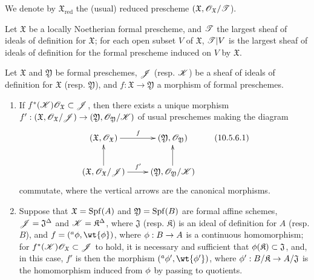 We denote by $\mathfrak{X}_\text{red}$ the (usual) reduced prescheme $(\mathfrak{X},\mathscr{O}_\mathfrak{X}/\mathscr{T}$).

\begin{corollary}[10.5.5]
\label{1.10.5.5}
Let $\mathfrak{X}$ be a locally Noetherian formal prescheme, and $\mathscr{T}$ the largest sheaf of ideals of definition for $\mathfrak{X}$; for each open subset $V$ of $\mathfrak{X}$, $\mathscr{T}|V$ is the largest sheaf of ideals of definition for the formal prescheme induced on $V$ by $\mathfrak{X}$.
\end{corollary}

\begin{proposition}[10.5.6]
\label{1.10.5.6}
Let $\mathfrak{X}$ and $\mathfrak{Y}$ be formal preschemes, $\mathscr{J}$ (resp. $\mathscr{K}$) be a sheaf of ideals of definition for $\mathfrak{X}$ (resp. $\mathfrak{Y}$), and $f:\mathfrak{X}\to\mathfrak{Y}$ a morphism of formal preschemes.
\begin{enumerate}[label=\emph{(\roman*)}]
  \item If $f^*(\mathscr{K})\mathscr{O}_\mathfrak{X}\subset\mathscr{J}$, then there exists a unique morphism $f':(\mathfrak{X},\sh{O}_\mathfrak{X}/\sh{J})\to(\mathfrak{Y},\sh{O}_\mathfrak{Y}/\sh{K})$ of usual preschemes making the diagram
    \begin{equation*}
    \label{1.10.5.6.1}
      \xymatrix{
        (\mathfrak{X},\sh{O}_\mathfrak{X})\ar[r]^f &
        (\mathfrak{Y},\sh{O}_\mathfrak{Y})\\
        (\mathfrak{X},\sh{O}_\mathfrak{X}/\sh{J})\ar[r]^{f'}\ar[u] &
        (\mathfrak{Y},\sh{O}_\mathfrak{Y}/\sh{K})\ar[u]
      }
      \tag{10.5.6.1}
    \end{equation*}
    commutate, where the vertical arrows are the canonical morphisms.
  \item Suppose that $\mathfrak{X}=\operatorname{Spf}(A)$ and $\mathfrak{Y}=\operatorname{Spf}(B)$ are formal affine schemes, $\mathscr{J}=\mathfrak{J}^\Delta$ and $\mathscr{K}=\mathfrak{K}^\Delta$, where $\mathfrak{J}$ (resp. $\mathfrak{K}$) is an ideal of definition for $A$ (resp. $B$), and $f=({}^a\vphi,\wt{\vphi})$, where $\vphi:B\to A$ is a continuous homomorphism;
    for $f^*(\mathscr{K})\mathscr{O}_\mathfrak{X}\subset\mathscr{J}$ to hold, it is necessary and sufficient that $\phi(\mathfrak{K})\subset\mathfrak{J}$, and, in this case, $f'$ is then the morphism $({}^a\vphi',\wt{\vphi'})$, where $\vphi':B/\mathfrak{K}\to A/\mathfrak{J}$ is the homomorphism induced from $\phi$ by passing to quotients.
\end{enumerate}
\end{proposition}

